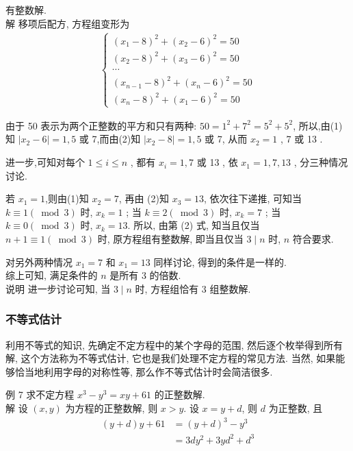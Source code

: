 有整数解.\\
解 移项后配方, 方程组变形为
\begin{align*}
	\left\{\begin{array}{c}
		       \left(x_{1}-8\right)^{2}+\left(x_{2}-6\right)^{2}=50   \\
		       \left(x_{2}-8\right)^{2}+\left(x_{3}-6\right)^{2}=50   \\
		       \cdots                                                 \\
		       \left(x_{n-1}-8\right)^{2}+\left(x_{n}-6\right)^{2}=50 \\
		       \left(x_{n}-8\right)^{2}+\left(x_{1}-6\right)^{2}=50
	       \end{array}\right.
\end{align*}

由于 50 表示为两个正整数的平方和只有两种: $50=1^{2}+7^{2}=5^{2}+5^{2}$, 所以,由(1)知 $\left|x_{2}-6\right|=1 ,  5$ 或 7,而由(2)知 $\left|x_{2}-8\right|=1 ,  5$ 或 7, 从而 $x_{2}=1$ ,  7 或 13 .

进一步,可知对每个 $1 \leqslant i \leqslant n$ , 都有 $x_{i}=1,7$ 或 13 , 依 $x_{1}=1 ,  7 ,  13$ , 分三种情况讨论.

若 $x_{1}=1$,则由(1)知 $x_{2}=7$, 再由 (2)知 $x_{3}=13$, 依次往下递推, 可知当 $k \equiv 1(\bmod 3)$ 时,  $x_{k}=1$ ; 当 $k \equiv 2(\bmod 3)$ 时,  $x_{k}=7$ ; 当 $k \equiv 0(\bmod 3)$ 时,  $x_{k}=13$. 所以, 由第 (2) 式, 知当且仅当 $n+1 \equiv 1(\bmod 3)$ 时, 原方程组有整数解, 即当且仅当 $3 \mid n$ 时, $n$ 符合要求.

对另外两种情况 $x_{1}=7$ 和 $x_{1}=13$ 同样讨论, 得到的条件是一样的.\\
综上可知, 满足条件的 $n$ 是所有 3 的倍数. \\
说明 进一步讨论可知, 当 $3 \mid n$ 时, 方程组恰有 3 组整数解.

\subsubsection{不等式估计}
利用不等式的知识, 先确定不定方程中的某个字母的范围, 然后逐个枚举得到所有解, 这个方法称为不等式估计, 它也是我们处理不定方程的常见方法. 当然, 如果能够恰当地利用字母的对称性等, 那么作不等式估计时会简洁很多.

例 7 求不定方程 $x^{3}-y^{3}=x y+61$ 的正整数解.\\
解 设 $(x, y)$ 为方程的正整数解, 则 $x>y$. 设 $x=y+d$, 则 $d$ 为正整数, 且\begin{align}
	(y+d) y+61 & =(y+d)^{3}-y^{3}           \\
	           & =3 d y^{2}+3 y d^{2}+d^{3}
\end{align}

